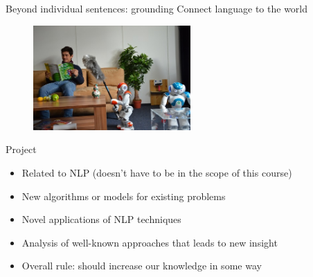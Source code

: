 \documentclass[usenames,dvipsnames,notes]{beamer}
\begin{document}
\begin{frame}
    {Beyond individual sentences: grounding}
    Connect language to the world

    \begin{center}
        \begin{figure}
        \includegraphics[height=4cm]{figures/robot-home}
        \end{figure}
    \end{center}
\end{frame}

\begin{frame}
    {Project}
    \begin{itemize}
        \itemsep1em
        \item Related to NLP (doesn't have to be in the scope of this course)
        \item New algorithms or models for existing problems
        \item Novel applications of NLP techniques 
        \item Analysis of well-known approaches that leads to new insight
        \item Overall rule: should increase our knowledge in some way
    \end{itemize}
\end{frame}
\end{document}
